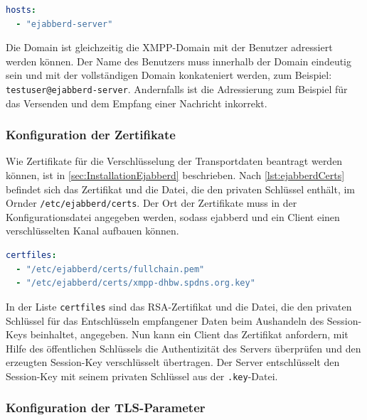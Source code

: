 \documentclass[a4paper,titlepage,halfparskip,12pt]{scrreprt}
\begin{document}
\begin{onehalfspacing}
\bigskip

\begin{lstlisting}[language=yaml, caption={Konfiguration der Domains},label={lst:configHosts}]
hosts:
  - "ejabberd-server"
\end{lstlisting}

Die Domain ist gleichzeitig die \ac{XMPP}-Domain mit der Benutzer adressiert werden können. Der Name des Benutzers muss innerhalb der Domain eindeutig sein und mit der vollständigen Domain konkateniert werden, zum Beispiel: \texttt{testuser@ejabberd-server}. Andernfalls ist die Adressierung zum Beispiel für das Versenden und dem Empfang einer Nachricht inkorrekt.

\subsubsection*{Konfiguration der Zertifikate}

Wie Zertifikate für die Verschlüsselung der Transportdaten beantragt werden können, ist in \autoref{sec:InstallationEjabberd} beschrieben. Nach \autoref{lst:ejabberdCerts} befindet sich das Zertifikat und die Datei, die den privaten Schlüssel enthält, im Ornder \texttt{/etc/ejabberd/certs}. Der Ort der Zertifikate muss in der Konfigurationsdatei angegeben werden, sodass ejabberd und ein Client einen verschlüsselten Kanal aufbauen können.

\bigskip

\begin{lstlisting}[language=yaml, caption={Konfiguration der Zertifikate}]
certfiles:
  - "/etc/ejabberd/certs/fullchain.pem"
  - "/etc/ejabberd/certs/xmpp-dhbw.spdns.org.key"
\end{lstlisting}

In der Liste \texttt{certfiles} sind das \ac{RSA}-Zertifikat und die Datei, die den privaten Schlüssel für das Entschlüsseln empfangener Daten beim Aushandeln des Session-Keys beinhaltet, angegeben. Nun kann ein Client das Zertifikat anfordern, mit Hilfe des öffentlichen Schlüssels die Authentizität des Servers überprüfen und den erzeugten Session-Key verschlüsselt übertragen. Der Server entschlüsselt den Session-Key mit seinem privaten Schlüssel aus der \texttt{.key}-Datei.

\subsubsection*{Konfiguration der \ac{TLS}-Parameter}


\end{onehalfspacing}
\end{document}
